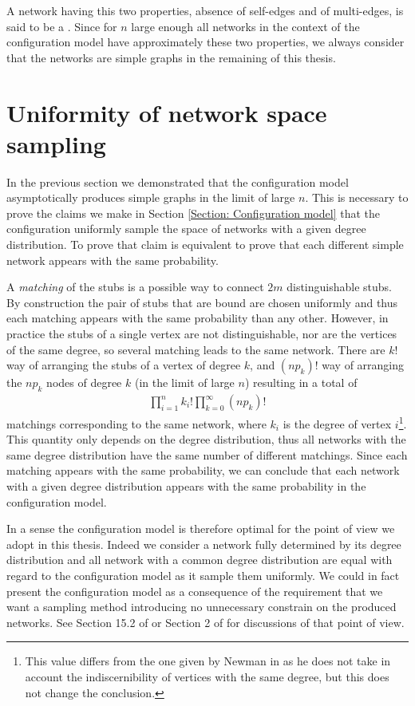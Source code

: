 \documentclass[
11pt, %
english, %
singlespacing, %
nolistspacing, %
liststotoc, %
headsepline, %
]{MastersDoctoralThesis} %
\begin{document}
A network having this two properties, absence of self-edges and of multi-edges, is said to be a . Since for $n$ large enough all networks in the context of the configuration model have approximately these two properties, we always consider that the networks are simple graphs in the remaining of this thesis.

\section{Uniformity of network space sampling}

In the previous section we demonstrated that the configuration model asymptotically produces simple graphs in the limit of large $n$. This is necessary to prove the claims we make in Section \ref{Section: Configuration model} that the configuration uniformly sample the space of networks with a given degree distribution. To prove that claim is equivalent to prove that each different simple network appears with the same probability.

A \emph{matching} of the stubs is a possible way to connect $2 m$ distinguishable stubs. By construction the pair of stubs that are bound are chosen uniformly and thus each matching appears with the same probability than any other. However, in practice the stubs of a single vertex are not distinguishable, nor are the vertices of the same degree, so several matching leads to the same network. There are $k!$ way of arranging the stubs of a vertex of degree $k$, and $(n p_k)!$ way of arranging the $n p_k$ nodes of degree $k$ (in the limit of large $n$) resulting in a total of
\begin{align}
	\prod_{i = 1}^n k_i! \prod_{k = 0}^\infty (n p_k)!
\end{align}
matchings corresponding to the same network, where $k_i$ is the degree of vertex $i$\footnote{This value differs from the one given by Newman in \cite{newman2010networks} as he does not take in account the indiscernibility of vertices with the same degree, but this does not change the conclusion.}. This quantity only depends on the degree distribution, thus all networks with the same degree distribution have the same number of different matchings. Since each matching appears with the same probability, we can conclude that each network with a given degree distribution appears with the same probability in the configuration model.

In a sense the configuration model is therefore optimal for the point of view we adopt in this thesis. Indeed we consider a network fully determined by its degree distribution and all network with a common degree distribution are equal with regard to the configuration model as it sample them uniformly. We could in fact present the configuration model as a consequence of the requirement that we want a sampling method introducing no unnecessary constrain on the produced networks. See Section 15.2 of \cite{newman2010networks} or Section 2 of \cite{bauer2002maximal} for discussions of that point of view.
\end{document}
